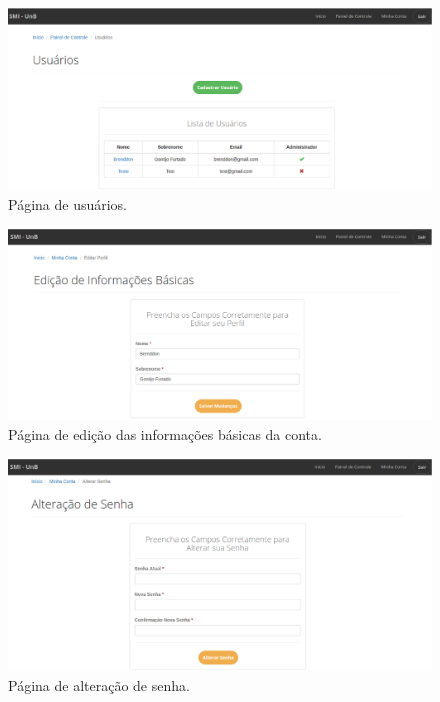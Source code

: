 \begin{apendicesenv}
\begin{figure}[!htpb]
    \centering
    \includegraphics[keepaspectratio=true,scale=0.35]{figuras/img2.eps}
    \caption{Página de usuários.}
    \label{img2}
\end{figure}

\begin{figure}[!htpb]
    \centering
    \includegraphics[keepaspectratio=true,scale=0.35]{figuras/img5.eps}
    \caption{Página de edição das informações básicas da conta.}
    \label{img5}
\end{figure}

\begin{figure}[!htpb]
    \centering
    \includegraphics[keepaspectratio=true,scale=0.35]{figuras/img6.eps}
    \caption{Página de alteração de senha.}
    \label{img6}
\end{figure}


\end{apendicesenv}
